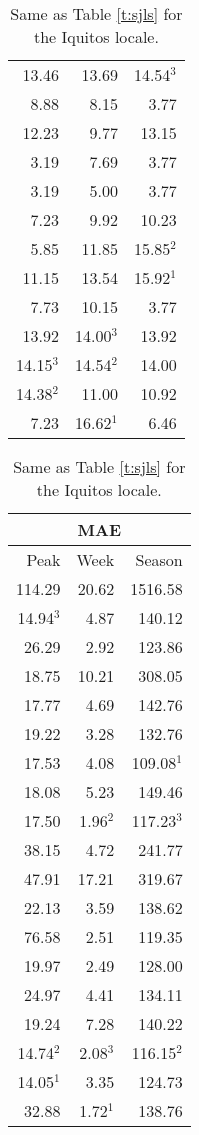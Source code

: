 \documentclass[12pt]{article}
\begin{document}
\begin{table}[ht!]
\begin{minipage}{4.5cm}
\begin{tabular}{rrr}
  13.46 & 13.69 & 14.54$^3$ \\ 
  8.88 & 8.15 & 3.77 \\ 
  12.23 & 9.77 & 13.15 \\ 
  3.19 & 7.69 & 3.77 \\ 
  3.19 & 5.00 & 3.77 \\ 
  7.23 & 9.92 & 10.23 \\ 
  5.85 & 11.85 & 15.85$^2$ \\ 
  11.15 & 13.54 & 15.92$^1$ \\ 
  7.73 & 10.15 & 3.77 \\ 
  13.92 & 14.00$^3$ & 13.92 \\ 
  14.15$^3$ & 14.54$^2$ & 14.00 \\ 
  14.38$^2$ & 11.00 & 10.92 \\ 
  7.23 & 16.62$^1$ & 6.46 \\ 
   \hline
\end{tabular}
\end{minipage}
\hfill
\begin{minipage}{4.5cm}
\begin{tabular}{rrr}
 \multicolumn{3}{c}{MAE} \\
  \hline
 Peak & Week & Season \\ 
  \hline
  114.29 & 20.62 & 1516.58 \\ 
  14.94$^3$ & 4.87 & 140.12 \\ 
  26.29 & 2.92 & 123.86 \\ 
  18.75 & 10.21 & 308.05 \\ 
  17.77 & 4.69 & 142.76 \\ 
  19.22 & 3.28 & 132.76 \\ 
  17.53 & 4.08 & 109.08$^1$ \\ 
  18.08 & 5.23 & 149.46 \\ 
  17.50 & 1.96$^2$ & 117.23$^3$ \\ 
  38.15 & 4.72 & 241.77 \\ 
  47.91 & 17.21 & 319.67 \\ 
  22.13 & 3.59 & 138.62 \\ 
  76.58 & 2.51 & 119.35 \\ 
  19.97 & 2.49 & 128.00 \\ 
  24.97 & 4.41 & 134.11 \\ 
  19.24 & 7.28 & 140.22 \\ 
  14.74$^2$ & 2.08$^3$ & 116.15$^2$ \\ 
  14.05$^1$ & 3.35 & 124.73 \\ 
  32.88 & 1.72$^1$ & 138.76 \\  
  \hline
\end{tabular}
\end{minipage}
\caption{Same as Table \ref{t:sjls} for the Iquitos locale.}
\label{t:iqls}
\end{table}
\end{document}
